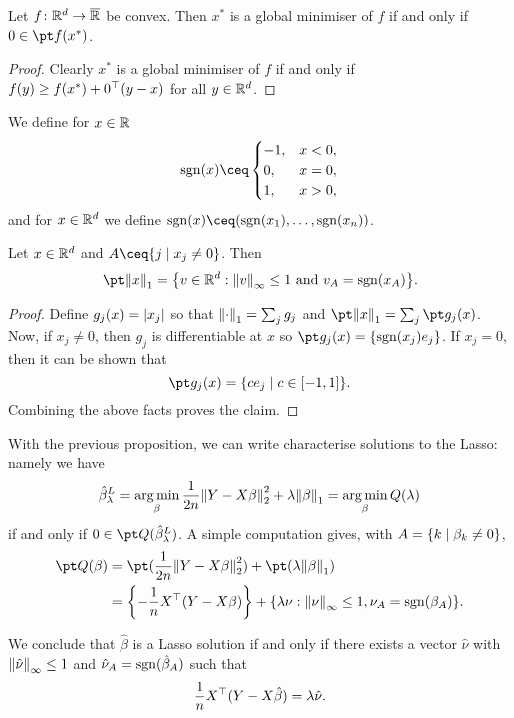 \begin{proposition}
	Let $f \colon \mathbb R^d \to \overline{\mathbb R}$ be convex. Then $x^*$ is a global minimiser of $f$ if and only if $0 \in \pt f(x^*)$. 
\end{proposition}

\begin{proof}
	Clearly $x^*$ is a global minimiser of $f$ if and only if $f(y) \geq f(x^*) + 0^\top (y - x)$ for all $y \in \mathbb R^d$. 
\end{proof}

We define for $x \in \mathbb R$
\[
\sign(x) \ceq\begin{cases}
	-1, &x<0,\\ 0, &x=0, \\ 1, &x>0,
\end{cases}
\]
and for $x \in \mathbb R^d$ we define $\sign(x) \ceq (\sign(x_1), \dotsc, \sign(x_n))$. 

\begin{proposition}
	Let $x \in \mathbb R^d$ and $A \ceq \qty{j \mid x_j \neq 0}$. Then
	\[
	\pt \norm{x}_1 = \qty{v \in \RR^d : \norm{v}_\infty \leq 1 \text{ and } v_A = \sign(x_A)}. 
	\]
\end{proposition}

\begin{proof}
	Define $g_j(x) = \abs{x_j}$ so that $\norm{\cdot}_1 = \sum_j g_j$ and $\pt \norm{x}_1 = \sum_j \pt g_j(x)$. Now, if $x_j \neq 0$, then $g_j$ is differentiable at $x$ so $\pt g_j(x) = \qty{\sign(x_j) e_j}$. If $x_j = 0$, then it can be shown that
	\[
	\pt g_j(x) = \qty{c e_j \mid c \in [-1, 1]}.
	\]
	Combining the above facts proves the claim. 
\end{proof}

With the previous proposition, we can write characterise solutions to the Lasso: namely we have
\[
\hat\beta_\lambda^L = \operatorname*{arg\,min}_\beta \frac1{2n} \norm{Y- X\beta}_2^2 + \lambda \norm{\beta}_1 = \operatorname*{arg\,min}_\beta Q(\lambda)
\]
if and only if $0 \in \pt Q(\hat \beta_\lambda^L)$. A simple computation gives, with $A = \qty{k \mid \beta_k \neq 0}$, 
\begin{align*}
\pt Q(\beta) &= \pt(\frac1{2n} \norm{Y- X\beta}_2^2) + \pt(\lambda \norm{\beta}_1) \\
&= \qty{-\frac1n X\T(Y - X\beta)} + \qty{\lambda \nu : \norm{\nu}_\infty \leq 1, \nu_A = \sign(\beta_A)}. 
\end{align*}

We conclude that $\hat\beta$ is a Lasso solution if and only if there exists a vector $\hat\nu$ with $\norm{\hat\nu}_{\infty} \leq 1$ and $\hat\nu_A = \operatorname{sgn}(\hat\beta_A)$ such that
\[
\frac1n X^\top(Y - X\hat\beta) = \lambda \hat\nu. 
\]

